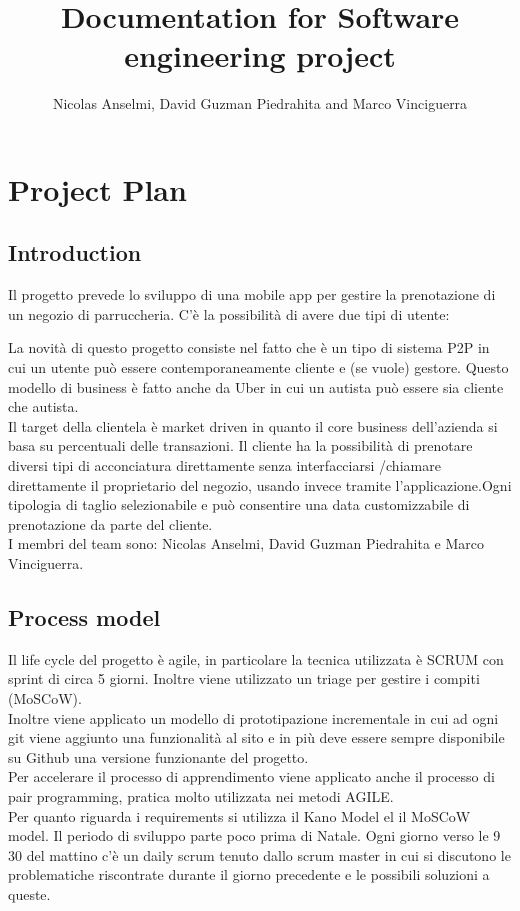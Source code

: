 \documentclass{article}
\title{Documentation for Software engineering project}
\author{Nicolas Anselmi, David Guzman Piedrahita and Marco Vinciguerra}
\begin{document}
\maketitle        
\section{Project Plan}
\subsection{Introduction}
Il progetto prevede lo sviluppo di una mobile app per gestire la prenotazione di 
un negozio di parruccheria. C'è la possibilità di avere due tipi di utente:

 La novità di questo progetto consiste nel fatto che è un tipo di sistema P2P in cui un utente può essere contemporaneamente cliente
e (se vuole) gestore. Questo modello di business è fatto anche da Uber in cui un autista può essere sia cliente che autista.
\\Il target della clientela è market driven in quanto il core business dell'azienda si basa su percentuali delle transazioni.
Il cliente ha la possibilità di prenotare diversi 
tipi di acconciatura direttamente senza interfacciarsi /chiamare direttamente il proprietario
del negozio, usando invece tramite l'applicazione.Ogni tipologia di taglio selezionabile e può consentire una data customizzabile di prenotazione 
da parte del cliente. 
\\I membri del team sono: Nicolas Anselmi, David Guzman Piedrahita e Marco Vinciguerra.
   
\subsection{Process model}
Il life cycle del progetto è agile, in particolare la tecnica utilizzata è SCRUM con
sprint di circa 5 giorni. Inoltre viene utilizzato un triage per
gestire i compiti (MoSCoW).
\\Inoltre viene applicato un modello di prototipazione incrementale in cui ad ogni git viene aggiunto una funzionalità al sito e in più deve essere sempre disponibile
su Github una versione funzionante del progetto.
\\Per accelerare il processo di apprendimento viene applicato anche il processo di pair programming, 
pratica molto utilizzata nei metodi AGILE.
\\Per quanto riguarda i requirements si utilizza il Kano Model el il MoSCoW model.
Il periodo di sviluppo parte poco prima di Natale. Ogni giorno verso le 9 30 del mattino 
c'è un daily scrum tenuto dallo scrum master in cui si discutono le problematiche riscontrate durante 
il giorno precedente e le possibili soluzioni a queste.
\end{document}
